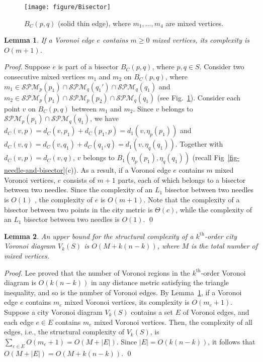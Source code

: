 \documentclass[11pt]{llncs}
\newtheorem{Lemma}{Lemma}
\newcommand{\SPM}{\ensuremath{\mathcal{SPM}}}
\newcommand{\kth}{\ensuremath{k^{\mathrm{th}}}\xspace}
\newcommand{\kthorder}{\kth-order\xspace}
\begin{document}
\begin{figure}
\centering
\texttt{[image: figure/Bisector]}
\caption{ $B_C(p, q)$ (solid thin edge), where $m_1, \ldots, m_4$ are mixed vertices.}\label{fig-Bisectors}
\end{figure}


\newcommand{\lemmVvtext}{If a Voronoi edge $e$ contains $m\geq 0$ mixed vertices,
its complexity is $O(m+1)$.
}

\begin{Lemma}\label{lem-mVv}
\lemmVvtext
\end{Lemma}
\begin{proof}
Suppose $e$ is part of a bisector $B_C(p, q)$, where $p, q\in S$.
Consider two consecutive mixed vertices $m_1$ and $m_2$ on $B_C(p, q)$,
where $m_1\in \SPM_p(p_1)\cap\SPM_q(q_1')\cap\SPM_q(q_1)$ and $m_2\in \SPM_p(p_1)\cap \SPM_p(p_2)\cap \SPM_q(q_1)$
(see Fig.~\ref{fig-Bisectors}).
Consider each point $v$ on $B_C(p,q)$ between $m_1$ and $m_2$.
Since $v$ belongs to $\SPM_p(p_1)\cap \SPM_q(q_1)$,
we have $d_C(v,p)=d_C(v,p_1)+d_C(p_1,p)=d_1(v,\eta_p(p_1))$ and $d_C(v,q)=d_C(v,q_1)+d_C(q_1,q)=d_1(v,\eta_q(q_1))$.
Together with $d_C(v,p)=d_C(v,q)$,
$v$ belongs to $B_1(\eta_p(p_1),\eta_q(q_1))$ (recall Fig~\ref{fig-needle-and-bisector}(c)).
As a result, if a Voronoi edge $e$ contains $m$ mixed Voronoi vertices,
$e$ consists of $m+1$ parts, each of which belongs to a bisector between two needles.
Since the complexity of an $L_1$ bisector between two needles is $O(1)$ \cite{BC-05},
the complexity of $e$ is $O(m + 1)$.
Note that the complexity of a bisector between two points in the city metric is $\Theta(c)$,
while the complexity of an $L_1$ bisector between two needles is $O(1)$.
\qed
\end{proof}

\newcommand{\lemmixuppertext}{An upper bound for the structural complexity of a \kthorder city Voronoi diagram $V_k(S)$
is $O(M + k(n-k))$, where $M$ is the total number of mixed vertices.
}

\begin{Lemma}\label{lem-mix-upper}
\lemmixuppertext
\end{Lemma}
\begin{proof}
Lee \cite{Lee-82} proved that the number of Voronoi regions in the \kthorder Voronoi diagram is $O(k(n-k))$
in any distance metric satisfying the triangle inequality, and so is the number of Voronoi edges.
By Lemma~\ref{lem-mVv}, if a Voronoi edge $e$ contains $m_e$ mixed Voronoi vertices, its complexity is $O(m_e + 1)$.
Suppose a city Voronoi diagram $V_k(S)$ contains a set $E$ of Voronoi edges,
and each edge $e\in E$ contains $m_e$ mixed Voronoi vertices.
Then, the complexity of all edges, i.e., the structural complexity of $V_k(S)$,
is $\sum_{e\in E} O(m_e + 1) = O(M + |E|)$.
Since $|E|=O(k(n-k))$, it follows that
$O(M + |E|) = O(M + k(n-k))$.
\qed
\end{proof}
\end{document}
